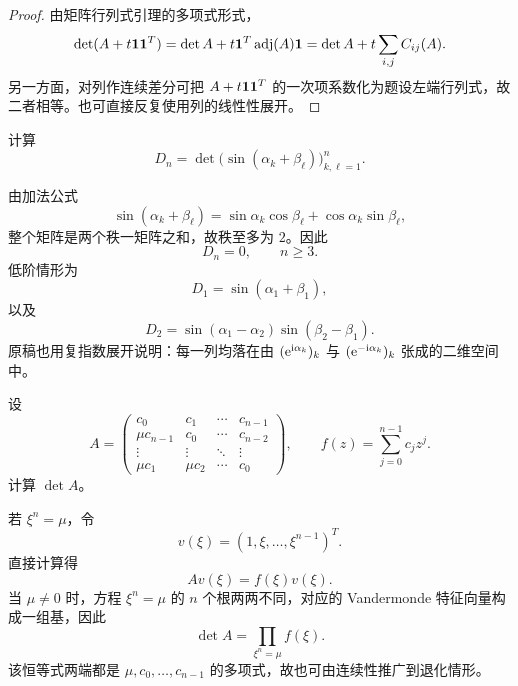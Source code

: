\begin{proof}
由矩阵行列式引理的多项式形式，
\begin{equation}
 \det(A+t\bm 1\bm 1^T)
 =\det A+t\bm 1^T\operatorname{adj}(A)\bm 1
 =\det A+t\sum_{i,j}C_{ij}(A).
\end{equation}
另一方面，对列作连续差分可把 $A+t\bm 1\bm 1^T$ 的一次项系数化为题设左端行列式，故二者相等。也可直接反复使用列的线性性展开。
\end{proof}

\begin{exercise}[正弦和矩阵的秩]
计算
\begin{equation}
 D_n=\det\bigl(\sin(\alpha_k+\beta_\ell)\bigr)_{k,\ell=1}^n.
\end{equation}
\end{exercise}

\begin{solution}
由加法公式
\begin{equation}
 \sin(\alpha_k+\beta_\ell)
 =\sin\alpha_k\cos\beta_\ell+
   \cos\alpha_k\sin\beta_\ell,
\end{equation}
整个矩阵是两个秩一矩阵之和，故秩至多为 $2$。因此
\begin{equation}
 D_n=0,
 \qquad n\geq3.
\end{equation}
低阶情形为
\begin{equation}
 D_1=\sin(\alpha_1+\beta_1),
\end{equation}
以及
\begin{equation}
 D_2
 =\sin(\alpha_1-\alpha_2)
  \sin(\beta_2-\beta_1).
\end{equation}
原稿也用复指数展开说明：每一列均落在由
$(\mathrm e^{\mathrm i\alpha_k})_k$ 与 $(\mathrm e^{-\mathrm i\alpha_k})_k$ 张成的二维空间中。
\end{solution}

\begin{exercise}[$\mu$-循环行列式]
设
\begin{equation}
 A=\begin{pmatrix}
 c_0&c_1&\cdots&c_{n-1}\\
 \mu c_{n-1}&c_0&\cdots&c_{n-2}\\
 \vdots&\vdots&\ddots&\vdots\\
 \mu c_1&\mu c_2&\cdots&c_0
 \end{pmatrix},
 \qquad
 f(z)=\sum_{j=0}^{n-1}c_jz^j.
\end{equation}
计算 $\det A$。
\end{exercise}

\begin{solution}
若 $\xi^n=\mu$，令
\begin{equation}
 v(\xi)=(1,\xi,\ldots,\xi^{n-1})^T.
\end{equation}
直接计算得
\begin{equation}
 Av(\xi)=f(\xi)v(\xi).
\end{equation}
当 $\mu\neq0$ 时，方程 $\xi^n=\mu$ 的 $n$ 个根两两不同，对应的 Vandermonde 特征向量构成一组基，因此
\begin{equation}
 \det A=\prod_{\xi^n=\mu}f(\xi).
\end{equation}
该恒等式两端都是 $\mu,c_0,\ldots,c_{n-1}$ 的多项式，故也可由连续性推广到退化情形。
\end{solution}
